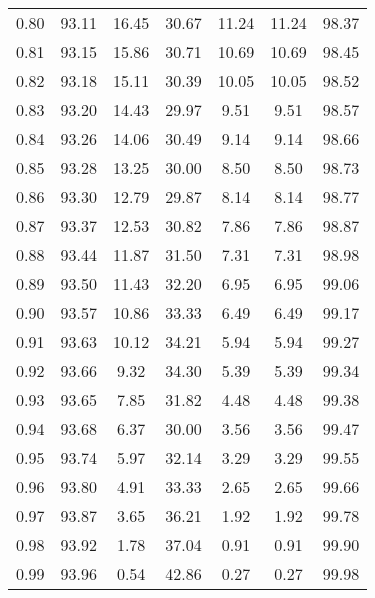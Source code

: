 \begin{tabular}{|c|c|c|c|c|c|c|}
      0.80 &     93.11 &     16.45 &      30.67 &   11.24 &      11.24 &         98.37 \\
      0.81 &     93.15 &     15.86 &      30.71 &   10.69 &      10.69 &         98.45 \\
      0.82 &     93.18 &     15.11 &      30.39 &   10.05 &      10.05 &         98.52 \\
      0.83 &     93.20 &     14.43 &      29.97 &    9.51 &       9.51 &         98.57 \\
      0.84 &     93.26 &     14.06 &      30.49 &    9.14 &       9.14 &         98.66 \\
      0.85 &     93.28 &     13.25 &      30.00 &    8.50 &       8.50 &         98.73 \\
      0.86 &     93.30 &     12.79 &      29.87 &    8.14 &       8.14 &         98.77 \\
      0.87 &     93.37 &     12.53 &      30.82 &    7.86 &       7.86 &         98.87 \\
      0.88 &     93.44 &     11.87 &      31.50 &    7.31 &       7.31 &         98.98 \\
      0.89 &     93.50 &     11.43 &      32.20 &    6.95 &       6.95 &         99.06 \\
      0.90 &     93.57 &     10.86 &      33.33 &    6.49 &       6.49 &         99.17 \\
      0.91 &     93.63 &     10.12 &      34.21 &    5.94 &       5.94 &         99.27 \\
      0.92 &     93.66 &      9.32 &      34.30 &    5.39 &       5.39 &         99.34 \\
      0.93 &     93.65 &      7.85 &      31.82 &    4.48 &       4.48 &         99.38 \\
      0.94 &     93.68 &      6.37 &      30.00 &    3.56 &       3.56 &         99.47 \\
      0.95 &     93.74 &      5.97 &      32.14 &    3.29 &       3.29 &         99.55 \\
      0.96 &     93.80 &      4.91 &      33.33 &    2.65 &       2.65 &         99.66 \\
      0.97 &     93.87 &      3.65 &      36.21 &    1.92 &       1.92 &         99.78 \\
      0.98 &     93.92 &      1.78 &      37.04 &    0.91 &       0.91 &         99.90 \\
      0.99 &     93.96 &      0.54 &      42.86 &    0.27 &       0.27 &         99.98 \\
\bottomrule
\end{tabular}
